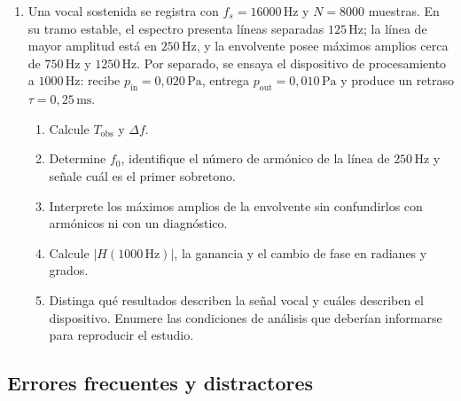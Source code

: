 \begin{enumerate}[label=\textbf{I\arabic*.},leftmargin=*]
    \item Una vocal sostenida se registra con
    \(f_s=16000\,\text{Hz}\) y \(N=8000\) muestras. En su tramo estable, el
    espectro presenta líneas separadas \(125\,\text{Hz}\); la línea de mayor
    amplitud está en \(250\,\text{Hz}\), y la envolvente posee máximos amplios
    cerca de \(750\,\text{Hz}\) y \(1250\,\text{Hz}\). Por separado, se ensaya
    el dispositivo de procesamiento a \(1000\,\text{Hz}\): recibe
    \(p_\mathrm{in}=0{,}020\,\text{Pa}\), entrega
    \(p_\mathrm{out}=0{,}010\,\text{Pa}\) y produce un retraso
    \(\tau=0{,}25\,\text{ms}\).
    \begin{enumerate}[label=\alph*)]
        \item Calcule \(T_\mathrm{obs}\) y \(\Delta f\).
        \item Determine \(f_0\), identifique el número de armónico de la línea
        de \(250\,\text{Hz}\) y señale cuál es el primer sobretono.
        \item Interprete los máximos amplios de la envolvente sin confundirlos
        con armónicos ni con un diagnóstico.
        \item Calcule \(\lvert H(1000\,\text{Hz})\rvert\), la ganancia y el
        cambio de fase en radianes y grados.
        \item Distinga qué resultados describen la señal vocal y cuáles
        describen el dispositivo. Enumere las condiciones de análisis que
        deberían informarse para reproducir el estudio.
    \end{enumerate}
\end{enumerate}

\subsection*{Errores frecuentes y distractores}

